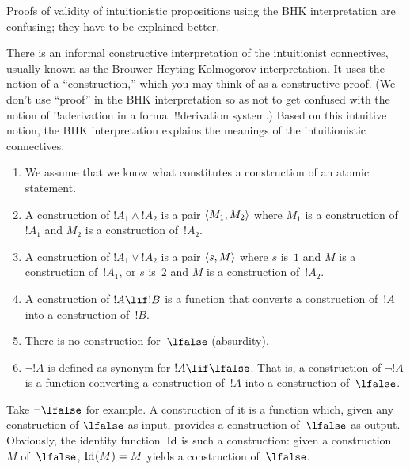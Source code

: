 \documentclass[../../../include/open-logic-section]{subfiles}
\begin{document}


\begin{editorial}
  Proofs of validity of intuitionistic propositions using the BHK
  interpretation are confusing; they have to be explained better.
\end{editorial}

There is an informal constructive interpretation of the intuitionist
connectives, usually known as the Brouwer-Heyting-Kolmogorov
interpretation. It uses the notion of a ``construction,'' which you
may think of as a constructive proof. (We don't use ``proof'' in the
BHK interpretation so as not to get confused with the notion of
!!a{derivation} in a formal !!{derivation} system.) Based on this intuitive
notion, the BHK interpretation explains the meanings of the
intuitionistic connectives.

\begin{enumerate}
\item We assume that we know what constitutes a construction of an atomic
  statement.
\item A construction of $!A_1 \land !A_2$ is a pair $\langle M_1, M_2 \rangle$
  where $M_1$ is a construction of~$!A_1$ and $M_2$ is a construction
  of~$!A_2$.
\item A construction of $!A_1 \lor !A_2$ is a pair $\langle s, M \rangle$
  where $s$ is~$1$ and $M$ is a construction of~$!A_1$, or $s$ is~$2$
  and $M$ is a construction of~$!A_2$.
\item A construction of $!A \lif !B$ is a function that converts a
  construction of~$!A$ into a construction of~$!B$.
\item There is no construction for~$\lfalse$ (absurdity).
\item $\lnot !A$ is defined as synonym for $!A \lif \lfalse$. That is,
  a construction of $\lnot !A$ is a function converting a construction
  of~$!A$ into a construction of~$\lfalse$.
\end{enumerate}

\begin{ex}
Take $\lnot \lfalse$ for example. A construction of it is a function
which, given any construction of $\lfalse$ as input, provides a
construction of~$\lfalse$ as output. Obviously, the identity
function~$\mathord{\mathrm{Id}_{}}$ is such a construction: given a construction~$M$
of~$\lfalse$, $\mathord{\mathrm{Id}_{}}(M) = M$ yields a construction of~$\lfalse$.
\end{ex}
\end{document}
